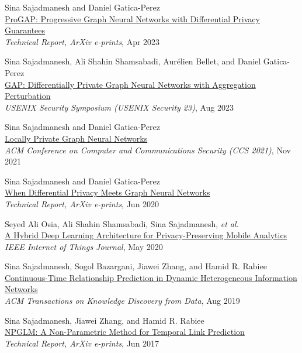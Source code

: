 \documentclass[11pt]{article}
\begin{document}
\begin{enumerate}[label={[\arabic*]}, leftmargin=15pt]
	\item {Sina Sajadmanesh} and Daniel Gatica-Perez\\
	\href{https://arxiv.org/abs/2304.08928}{{ProGAP: Progressive Graph Neural Networks with Differential Privacy Guarantees}}\\
	\textit{Technical Report, ArXiv e-prints}, Apr 2023

	\item {Sina Sajadmanesh}, Ali Shahin Shamsabadi, Aurélien Bellet, and Daniel Gatica-Perez\\
	\href{https://arxiv.org/abs/2203.00949}{{GAP: Differentially Private Graph Neural Networks with Aggregation Perturbation}}\\
	\textit{USENIX Security Symposium (USENIX Security 23)}, Aug 2023

	\item {Sina Sajadmanesh} and Daniel Gatica-Perez\\
	\href{https://arxiv.org/abs/2006.05535}{{Locally Private Graph Neural Networks}}\\
	\textit{ACM Conference on Computer and Communications Security (CCS 2021)}, Nov 2021

  \item {Sina Sajadmanesh} and Daniel Gatica-Perez\\
	\href{https://arxiv.org/abs/2006.05535v3}{{When Differential Privacy Meets Graph Neural Networks}}\\
	\textit{Technical Report, ArXiv e-prints}, Jun 2020

	\item Seyed Ali Osia, Ali Shahin Shamsabadi, {Sina Sajadmanesh}, \textit{et al.}\\
	\href{https://arxiv.org/abs/1703.02952}{{A Hybrid Deep Learning Architecture for Privacy-Preserving Mobile Analytics}}\\
	\textit{IEEE Internet of Things Journal}, May 2020

	\item {Sina Sajadmanesh}, Sogol Bazargani, Jiawei Zhang, and Hamid R. Rabiee\\
	\href{https://arxiv.org/abs/1710.00818}{{Continuous-Time Relationship Prediction in Dynamic Heterogeneous Information Networks}}\\
	\textit{ACM Transactions on Knowledge Discovery from Data}, Aug 2019

	\item {Sina Sajadmanesh}, Jiawei Zhang, and Hamid R. Rabiee\\
	\href{https://arxiv.org/abs/1706.06783}{{NPGLM: A Non-Parametric Method for Temporal Link Prediction}}\\
	\textit{Technical Report, ArXiv e-prints}, Jun 2017


\end{enumerate}
\end{document}
